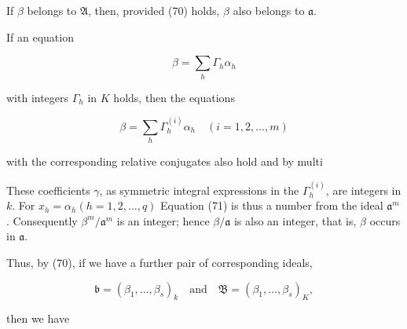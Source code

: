 If $\beta$ belongs to $\mathfrak{A}$, then, provided (70) holds, $\beta$ also belongs to $\mathfrak{a}$.

If an equation

$$\beta = \sum_h \Gamma_h \alpha_h$$

with integers $\Gamma_h$ in $K$ holds, then the equations

$$\beta = \sum_h \Gamma_h^{(i)} \alpha_h \quad (i = 1, 2, \ldots, m)$$

with the corresponding relative conjugates also hold and by multi

These coefficients $\gamma$, as symmetric integral expressions in the $\Gamma_h^{(i)}$, are integers in $k$. For $x_h = \alpha_h (h = 1, 2, \ldots, q)$ Equation (71) is thus a number from the ideal $\mathfrak{a}^m$. Consequently $\beta^m/\mathfrak{a}^m$ is an integer; hence $\beta/\mathfrak{a}$ is also an integer, that is, $\beta$ occurs in $\mathfrak{a}$.

Thus, by (70), if we have a further pair of corresponding ideals,

$$\mathfrak{b} = (\beta_1, \ldots, \beta_s)_k \quad \text{and} \quad \mathfrak{B} = (\beta_1, \ldots, \beta_s)_K,$$

then we have
